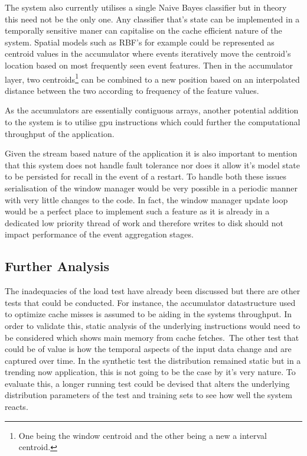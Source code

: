 \documentclass[a4paper,11pt]{scrreprt}
\begin{document}
The system also currently utilises a single Naive Bayes classifier but in theory this need not be the only one. Any classifier that's state can be implemented in a temporally sensitive maner can capitalise on the cache efficient nature of the system. Spatial models such as RBF's for example could be represented as centroid values in the accumulator where events iteratively move the centroid's location based on most frequently seen event features. Then in the accumulator layer, two centroids\footnote{One being the window centroid and the other being a new a interval centroid.} can be combined to a new position based on an interpolated distance between the two according to frequency of the feature values.\

As the accumulators are essentially contiguous arrays, another potential addition to the system is to utilise \acrshort{gpu} instructions which could further the computational throughput of the application.\

Given the stream based nature of the application it is also important to mention that this system does not handle fault tolerance nor does it allow it's model state to be persisted for recall in the event of a restart. To handle both these issues serialisation of the window manager would be very possible in a periodic manner with very little changes to the code. In fact, the window manager update loop would be a perfect place to implement such a feature as it is already in a dedicated low priority thread of work and therefore writes to disk should not impact performance of the event aggregation stages.
\subsection{Further Analysis}
The inadequacies of the load test have already been discussed but there are other tests that could be conducted. For instance, the accumulator datastructure used to optimize cache misses is assumed to be aiding in the systems throughput. In order to validate this, static analysis of the underlying instructions would need to be considered which shows main memory from cache fetches.\
The other test that could be of value is how the temporal aspects of the input data change and are captured over time. In the synthetic test the distribution remained static but in a trending now application, this is not going to be the case by it's very nature. To evaluate this, a longer running test could be devised that alters the underlying distribution parameters of the test and training sets to see how well the system reacts.
\end{document}
